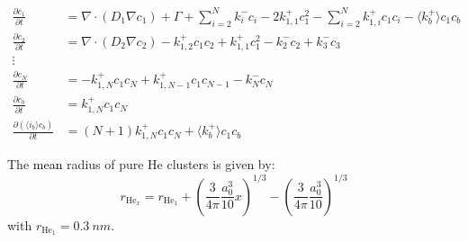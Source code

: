 \begin{subequations}
    \begin{align}
        \frac{\partial c_1}{\partial t} &= \nabla \cdot (D_1 \nabla c_1) + \Gamma + \sum\limits_{i=2}^N k_{i}^- c_i- 2k_{1, 1}^+ c_1^2 - \sum\limits_{i=2}^N k_{1,i}^+ c_1 c_i - \langle k_b^+ \rangle c_1 c_b \\
        \frac{\partial c_2}{\partial t} &= \nabla \cdot (D_2 \nabla c_2) - k_{1, 2}^+ c_1 c_2 + k_{1, 1}^+ c_1^2 - k_{2}^- c_2 + k_{3}^- c_3\\
        \vdots \nonumber\\
        \frac{\partial c_N}{\partial t} &= - k_{1, N}^+ c_1 c_N + k_{1, N-1}^+ c_1 c_{N-1} - k_{N}^- c_N\\
        \frac{\partial c_b}{\partial t} &= k_ {1,N}^+ c_1 c_N \\
        \frac{\partial (\langle i_b \rangle c_b)}{\partial t} &= (N+1)k_ {1,N}^+ c_1 c_N  + \langle k_b^+ \rangle c_1 c_b
    \end{align}
    \label{eq: temporal evolution grouping}
\end{subequations}

The \textcolor{black}{mean} radius of pure He clusters is given by:
\begin{equation}
    r_{\mathrm{He}_x} = r_{\mathrm{He}_1} + \left(\frac{3}{4\pi} \frac{a_0^3}{10} x \right)^{1/3} - \left( \frac{3}{4\pi} \frac{a_0^3}{10} \right)^{1/3}
    \label{eq: radius pure He}
\end{equation}
with $r_{\mathrm{He}_1} = \SI{0.3}{nm}$.

